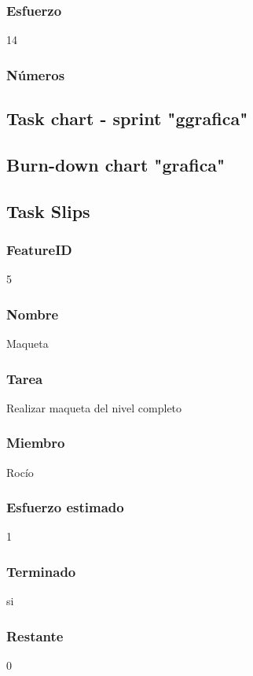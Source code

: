 \subsubsection{Esfuerzo}
14
\subsubsection{Números}



\subsection{Task chart - sprint "ggrafica"}



\subsection{Burn-down chart "grafica"}


\subsection{Task Slips}


\subsubsection{FeatureID}5
\subsubsection{Nombre}Maqueta
\subsubsection{Tarea}Realizar maqueta del nivel completo
\subsubsection{Miembro}Rocío
\subsubsection{Esfuerzo estimado}1
\subsubsection{Terminado}si
\subsubsection{Restante}0


